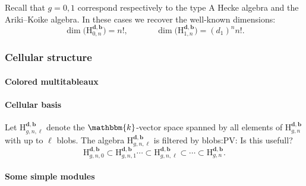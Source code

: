\documentclass[a4paper,11pt]{amsart}
\newcommand{\setstuff}[1]{\mathrm{#1}}
\newcommand{\KK}{\mathbbm{k}}
\newcommand{\bsym}[1]{\boldsymbol{#1}}
\newcommand{\bpar}{\bsym{b}}
\newcommand{\dpar}{\bsym{d}}
\def\PV#1{\textcolor[rgb]{0.00,0.00,1.00}{PV: #1}}
\numberwithin{equation}{section}
\begin{document}
\begin{remark}
Recall that $g=0,1$ correspond respectively to the type A Hecke algebra and the Ariki--Koike algebra. In these cases we recover the well-known dimensions:
\[
\dim\bigl( \setstuff{H}_{0,n}^{\dpar,\bpar} \bigr) =  n! ,
\mspace{60mu}
\dim\bigl( \setstuff{H}_{1,n}^{\dpar,\bpar} \bigr) = (d_1)^n n! .
\]
\end{remark}

\subsubsection{Cellular structure }

\paragraph{Colored multitableaux}

\paragraph{Cellular basis}

{\color{purple}Let $\setstuff{H}_{g,n,\ell}^{\dpar,\bpar}$ denote the $\KK$-vector space spanned by all elements of $\setstuff{H}_{g,n}^{\dpar,\bpar}$ with up to $\ell$ blobs.
The algebra $\setstuff{H}_{g,n,\ell}^{\dpar,\bpar}$ is filtered by blobs:\PV{Is this usefull?}
\[
\setstuff{H}_{g,n,0}^{\dpar,\bpar}\subset \setstuff{H}_{g,n,1}^{\dpar,\bpar}
\dotsm \subset \setstuff{H}_{g,n,\ell}^{\dpar,\bpar}\subset \dotsm \subset
\setstuff{H}_{g,n}^{\dpar,\bpar} . 
\]

}

\paragraph{Some simple modules}


\end{document}
